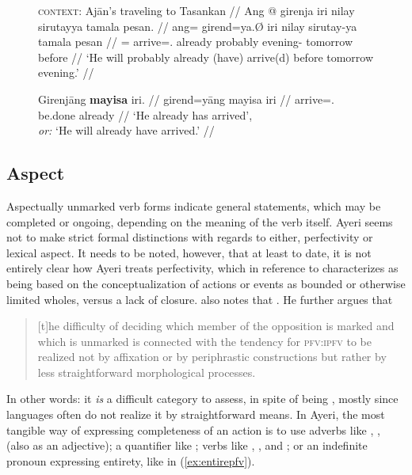 \begin{figure}[h]
\ex\label{ex:futperf}
\begingl
	\glpreamble \textsc{context}: Ajān's traveling to Tasankan //
	\gla Ang @ girenja iri nilay sirutayya tamala pesan. //
	\glb ang= girend=ya.Ø iri nilay sirutay-ya tamala pesan //
	\glc \AgtT{}= arrive=\TsgM{}.\Top{} already probably evening-\Loc{}
		tomorrow before //
	\glft `He will probably already (have) arrive(d) before 
		tomorrow evening.' //
\endgl
\xe
\end{figure}

\begin{figure}[h]
\ex\label{ex:futlexpfv}
\begingl
	\gla Girenjāng \textbf{mayisa} iri. //
	\glb girend=yāng mayisa iri //
	\glc arrive=\TsgM{}.\Aarg{} be.done already //
	\glft `He already has arrived', \\
		\textit{or:} `He will already have arrived.' //
\endgl
\xe
\end{figure}



\subsection{Aspect}
\label{subsec:aspect}

Aspectually unmarked verb forms indicate general statements, which may be
completed or ongoing, depending on the meaning of the verb itself. Ayeri seems
not to make strict formal distinctions with regards to either, perfectivity or
lexical aspect. It needs to be noted, however, that at least to date, it is not
entirely clear how Ayeri treats perfectivity, which \citet[76]{dahl1985} in
reference to \citet[16]{comrie1976} characterizes as being based on the
conceptualization of actions or events as bounded or otherwise limited wholes,
versus a lack of closure. \citet{dahl1985} also notes that
. He further argues that

\blockcquote[73]{dahl1985}{[t]he difficulty of deciding which member of the
opposition is marked and which is unmarked is connected with the tendency for
\textsc{pfv:ipfv} to be realized not by affixation or by periphrastic
constructions but rather by less straightforward morphological processes.}

In other words: it \emph{is} a difficult category to assess, in spite of being
,
mostly since languages often do not realize it by straightforward means. In
Ayeri, the most tangible way of expressing completeness of an action is to
use adverbs like , ,
 (also as an adjective); a quantifier like
; verbs like ,
, and ; or an indefinite
pronoun expressing entirety, like  in
(\ref{ex:entirepfv}).

